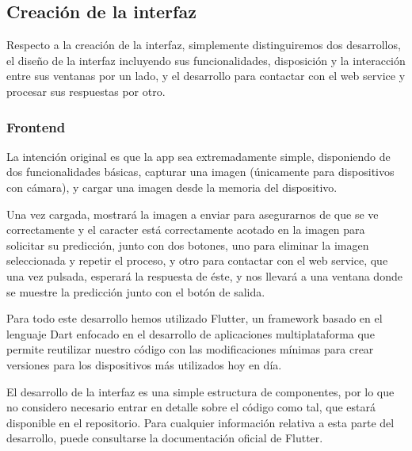 \documentclass{article}
\begin{document}
\subsection{Creación de la interfaz}

Respecto a la creación de la interfaz, simplemente distinguiremos dos desarrollos, el diseño de la interfaz incluyendo sus funcionalidades, disposición y la interacción entre sus ventanas por un lado, y el desarrollo para contactar con el web service y procesar sus respuestas por otro.

\subsubsection{Frontend}
La intención original es que la app sea extremadamente simple, disponiendo de dos funcionalidades básicas, capturar una imagen (únicamente para dispositivos con cámara), y cargar una imagen desde la memoria del dispositivo.

Una vez cargada, mostrará la imagen a enviar para asegurarnos de que se ve correctamente y el caracter está correctamente acotado en la imagen para solicitar su predicción, junto con dos botones, uno para eliminar la imagen seleccionada y repetir el proceso, y otro para contactar con el web service, que una vez pulsada, esperará la respuesta de éste, y nos llevará a una ventana donde se muestre la predicción junto con el botón de salida.

Para todo este desarrollo hemos utilizado Flutter, un framework basado en el lenguaje Dart enfocado en el desarrollo de aplicaciones multiplataforma que permite reutilizar nuestro código con las modificaciones mínimas para crear versiones para los dispositivos más utilizados hoy en día.

El desarrollo de la interfaz es una simple estructura de componentes, por lo que no considero necesario entrar en detalle sobre el código como tal, que estará disponible en el repositorio. Para cualquier información relativa a esta parte del desarrollo, puede consultarse la documentación oficial de Flutter.
\end{document}
